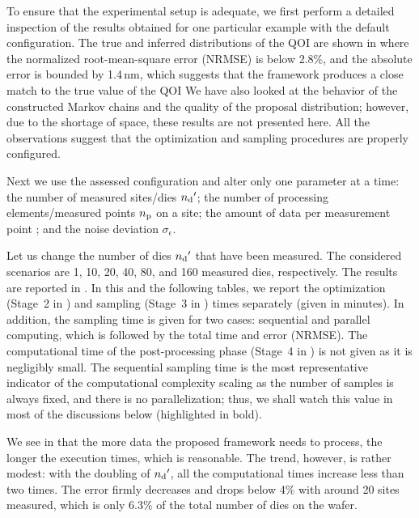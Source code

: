 To ensure that the experimental setup is adequate, we first perform a detailed
inspection of the results obtained for one particular example with the default
configuration. The true and inferred distributions of the \ac{QOI} are shown in
 where the normalized root-mean-square error (NRMSE) is below
2.8\%, and the absolute error is bounded by 1.4$\,$nm, which suggests that the
framework produces a close match to the true value of the \ac{QOI} We have also
looked at the behavior of the constructed Markov chains and the quality of the
proposal distribution; however, due to the shortage of space, these results are
not presented here. All the observations suggest that the optimization and
sampling procedures are properly configured.

Next we use the assessed configuration and alter only one parameter at a time:
the number of measured sites/dies ${n_\mathrm{d}}'$; the number of processing
elements/measured points ${n_\mathrm{p}}$ on a site; the amount of data per measurement
point \ns; and the noise deviation $\sigma_\epsilon$.

Let us change the number of dies ${n_\mathrm{d}}'$ that have been measured. The considered
scenarios are 1, 10, 20, 40, 80, and 160 measured dies, respectively. The
results are reported in . In this and the following
tables, we report the optimization (Stage~2 in ) and sampling
(Stage~3 in ) times separately (given in minutes). In addition,
the sampling time is given for two cases: sequential and parallel computing,
which is followed by the total time and error (NRMSE). The computational time of
the post-processing phase (Stage~4 in ) is not given as it is
negligibly small. The sequential sampling time is the most representative
indicator of the computational complexity scaling as the number of samples is
always fixed, and there is no parallelization; thus, we shall watch this value
in most of the discussions below (highlighted in bold).

We see in  that the more data the proposed framework
needs to process, the longer the execution times, which is reasonable. The
trend, however, is rather modest: with the doubling of ${n_\mathrm{d}}'$, all the
computational times increase less than two times. The error firmly decreases and
drops below 4\% with around 20 sites measured, which is only 6.3\% of the total
number of dies on the wafer.

